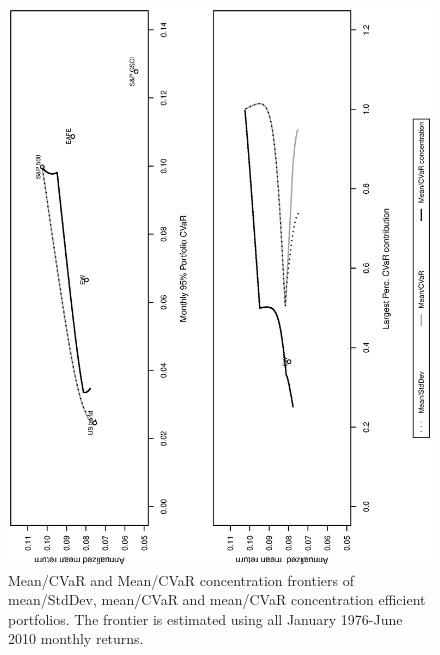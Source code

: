 \documentclass[11pt]{article}
\begin{document}

\begin{figure}[tb]
\begin{center}
\caption{Mean/CVaR and Mean/CVaR concentration frontiers of mean/StdDev, mean/CVaR and mean/CVaR concentration efficient 
portfolios. The frontier is  estimated using all January 1976-June 2010 monthly returns.  }
\includegraphics[width=12cm,angle=270]{frontier_fourassets.eps}
\end{center}
\end{figure}
\end{document}

